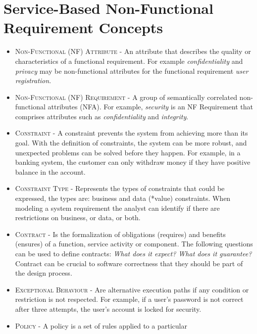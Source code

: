 

\chapter{Service-Based Non-Functional Requirement Concepts}
\label{app:nfr-concepts}

\begin{itemize} 
  \item \textsc{Non-Functional (NF) Attribute -} An attribute that describes
the quality or characteristics of a functional requirement. For example
\textit{confidentiality} and \textit{privacy} may be
non-functional attributes for the functional requirement \textit{user
registration}.
  \item \textsc{Non-Functional (NF) Requirement -} A group of semantically
correlated non-functional attributes (NFA). For example, \textit{security} is
an NF Requirement that comprises attributes such as \textit{confidentiality}
and \textit{integrity}. 
  \item \textsc{Constraint -} A constraint prevents the system
  from achieving more than its goal. With the definition of constraints, the
  system  can be more robust, and unexpected problems can be solved before they
  happen. For example, in a banking system, the customer can only withdraw
  money if they have positive balance in the account.
    \item \textsc{Constraint Type -} Represents the types of
  constraints that could be expressed, the types are: business and data
  (*value) constraints. When modeling a system requirement the analyst can identify if there are restrictions on
  business, or data, or both. 
  \item \textsc{Contract -} Is the formalization of obligations (requires) and
  benefits (ensures) of a function, service activity or component.
  The following questions can be used to define contracts: \textit{What does it
  expect? What does it guarantee?} Contract can be crucial to software
  correctness that they should be part of the design process.
  \item \textsc{Exceptional Behaviour -} Are alternative execution paths if
  any condition or restriction is not respected. For example, if a user's password
  is not correct after three attempts, the user's account is locked for
  security.
  \item \textsc{Policy -} A policy is a set of rules applied to a particular

\end{itemize}
